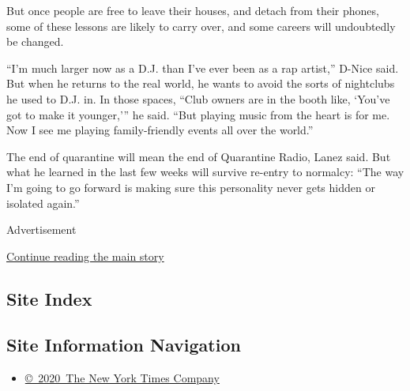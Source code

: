 But once people are free to leave their houses, and detach from their
phones, some of these lessons are likely to carry over, and some careers
will undoubtedly be changed.

``I'm much larger now as a D.J. than I've ever been as a rap artist,''
D-Nice said. But when he returns to the real world, he wants to avoid
the sorts of nightclubs he used to D.J. in. In those spaces, ``Club
owners are in the booth like, `You've got to make it younger,''' he
said. ``But playing music from the heart is for me. Now I see me playing
family-friendly events all over the world.''

The end of quarantine will mean the end of Quarantine Radio, Lanez said.
But what he learned in the last few weeks will survive re-entry to
normalcy: ``The way I'm going to go forward is making sure this
personality never gets hidden or isolated again.''

Advertisement

\protect\hyperlink{after-bottom}{Continue reading the main story}

\hypertarget{site-index}{%
\subsection{Site Index}\label{site-index}}

\hypertarget{site-information-navigation}{%
\subsection{Site Information
Navigation}\label{site-information-navigation}}

\begin{itemize}
\tightlist
\item
  \href{https://help.nytimes3xbfgragh.onion/hc/en-us/articles/115014792127-Copyright-notice}{©~2020~The
  New York Times Company}
\end{itemize}


